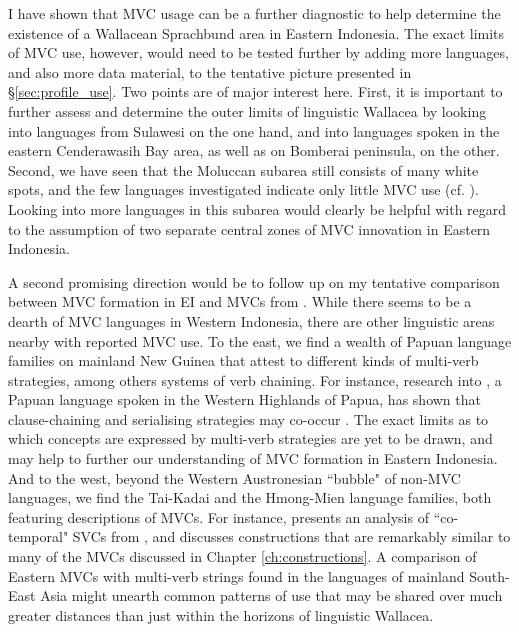 I have shown that MVC usage can be a further diagnostic to help determine the existence of a Wallacean Sprachbund area in Eastern Indonesia. The exact limits of MVC use, however, would need to be tested further by adding more languages, and also more data material, to the tentative picture presented in §\ref{sec:profile_use}. Two points are of major interest here. First, it is important to further assess and determine the outer limits of linguistic Wallacea by looking into languages from Sulawesi on the one hand, and into languages spoken in the eastern Cenderawasih Bay area, as well as on Bomberai peninsula, on the other.  Second, we have seen that the Moluccan subarea still consists of many white spots, and the few languages investigated indicate only little MVC use (cf. ). Looking into more languages in this subarea would clearly be helpful with regard to the assumption of two separate central zones of MVC innovation in Eastern Indonesia.

A second promising direction would be to follow up on my tentative comparison between MVC formation in EI and MVCs from . While there seems to be a dearth of MVC languages in Western Indonesia, there are other linguistic areas nearby with reported MVC use. To the east, we find a wealth of Papuan language families on mainland New Guinea that attest to different kinds of multi-verb strategies, among others systems of verb chaining. For instance, research into , a Papuan language spoken in the Western Highlands of  Papua, has shown that clause-chaining and serialising strategies may co-occur \citep{riesberg2013}. The exact limits as to which concepts are expressed by multi-verb strategies are yet to be drawn, and may help to further our understanding of MVC formation in Eastern Indonesia. And to the west, beyond the Western Austronesian ``bubble" of non-MVC languages, we find the Tai-Kadai and the Hmong-Mien language families, both featuring descriptions of MVCs. For instance, \citet{jarkey2010cotemporal} presents an analysis of ``co-temporal" SVCs from , and discusses constructions that are remarkably similar to many of the MVCs discussed in Chapter \ref{ch:constructions}. A comparison of Eastern  MVCs with multi-verb strings found in the languages of mainland South-East Asia might unearth common patterns of use that may be shared over much greater distances than just within the horizons of linguistic Wallacea.

